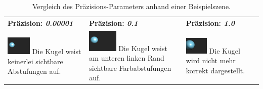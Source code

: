 \begin{table}[H]
    \centering
    \caption{Vergleich des Präzisions-Parameters anhand einer Beispielszene.}\label{table:sphere_tracing_precision}
    \begin{tabular}{p{}p{}p{}}
        \toprule
            \textbf{Präzision: \textit{0.00001}} &
            \textbf{Präzision: \textit{0.1}}     &
            \textbf{Präzision: \textit{1.0}}     \\
        \cmidrule(r){1-1}\cmidrule(lr){2-2}\cmidrule(l){3-3}
            \includegraphics[width=0.3\textwidth]{img/sphere_tracing_precision_full.pdf} \newline
            Die Kugel weist keinerlei sichtbare Abstufungen auf. &
            \includegraphics[width=0.3\textwidth]{img/sphere_tracing_precision_min.pdf} \newline
            Die Kugel weist am unteren linken Rand sichtbare Farbabstufungen auf. &
            \includegraphics[width=0.3\textwidth]{img/sphere_tracing_precision_pos.pdf} \newline
            Die Kugel wird nicht mehr korrekt dargestellt. \\
        \bottomrule
    \end{tabular}
\end{table}


